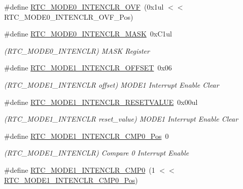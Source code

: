 \begin{DoxyCompactItemize}
\#define \mbox{\hyperlink{group___s_a_m_d21___r_t_c_gada2ce98567dd0b9b1b7ea3309c854335}{R\+T\+C\+\_\+\+M\+O\+D\+E0\+\_\+\+I\+N\+T\+E\+N\+C\+L\+R\+\_\+\+O\+VF}}~(0x1ul $<$$<$ R\+T\+C\+\_\+\+M\+O\+D\+E0\+\_\+\+I\+N\+T\+E\+N\+C\+L\+R\+\_\+\+O\+V\+F\+\_\+\+Pos)
\item 
\#define \mbox{\hyperlink{group___s_a_m_d21___r_t_c_gaca8e7ad740734f363069747089473034}{R\+T\+C\+\_\+\+M\+O\+D\+E0\+\_\+\+I\+N\+T\+E\+N\+C\+L\+R\+\_\+\+M\+A\+SK}}~0x\+C1ul
\begin{DoxyCompactList}\small\item\em (R\+T\+C\+\_\+\+M\+O\+D\+E0\+\_\+\+I\+N\+T\+E\+N\+C\+LR) M\+A\+SK Register \end{DoxyCompactList}\item 
\#define \mbox{\hyperlink{group___s_a_m_d21___r_t_c_ga7c25664625a464e491e269a25d995f8b}{R\+T\+C\+\_\+\+M\+O\+D\+E1\+\_\+\+I\+N\+T\+E\+N\+C\+L\+R\+\_\+\+O\+F\+F\+S\+ET}}~0x06
\begin{DoxyCompactList}\small\item\em (R\+T\+C\+\_\+\+M\+O\+D\+E1\+\_\+\+I\+N\+T\+E\+N\+C\+LR offset) M\+O\+D\+E1 Interrupt Enable Clear \end{DoxyCompactList}\item 
\#define \mbox{\hyperlink{group___s_a_m_d21___r_t_c_ga3ee33f3e7ac38410b74c06f29bd3a912}{R\+T\+C\+\_\+\+M\+O\+D\+E1\+\_\+\+I\+N\+T\+E\+N\+C\+L\+R\+\_\+\+R\+E\+S\+E\+T\+V\+A\+L\+UE}}~0x00ul
\begin{DoxyCompactList}\small\item\em (R\+T\+C\+\_\+\+M\+O\+D\+E1\+\_\+\+I\+N\+T\+E\+N\+C\+LR reset\+\_\+value) M\+O\+D\+E1 Interrupt Enable Clear \end{DoxyCompactList}\item 
\#define \mbox{\hyperlink{group___s_a_m_d21___r_t_c_ga1bb4c784be111d608e9f236277a6fa9e}{R\+T\+C\+\_\+\+M\+O\+D\+E1\+\_\+\+I\+N\+T\+E\+N\+C\+L\+R\+\_\+\+C\+M\+P0\+\_\+\+Pos}}~0
\begin{DoxyCompactList}\small\item\em (R\+T\+C\+\_\+\+M\+O\+D\+E1\+\_\+\+I\+N\+T\+E\+N\+C\+LR) Compare 0 Interrupt Enable \end{DoxyCompactList}\item 
\#define \mbox{\hyperlink{group___s_a_m_d21___r_t_c_ga02c8455aa83af95ee7247d0293c75bc3}{R\+T\+C\+\_\+\+M\+O\+D\+E1\+\_\+\+I\+N\+T\+E\+N\+C\+L\+R\+\_\+\+C\+M\+P0}}~(1 $<$$<$ \mbox{\hyperlink{group___s_a_m_d21___r_t_c_ga1bb4c784be111d608e9f236277a6fa9e}{R\+T\+C\+\_\+\+M\+O\+D\+E1\+\_\+\+I\+N\+T\+E\+N\+C\+L\+R\+\_\+\+C\+M\+P0\+\_\+\+Pos}})

\end{DoxyCompactItemize}
